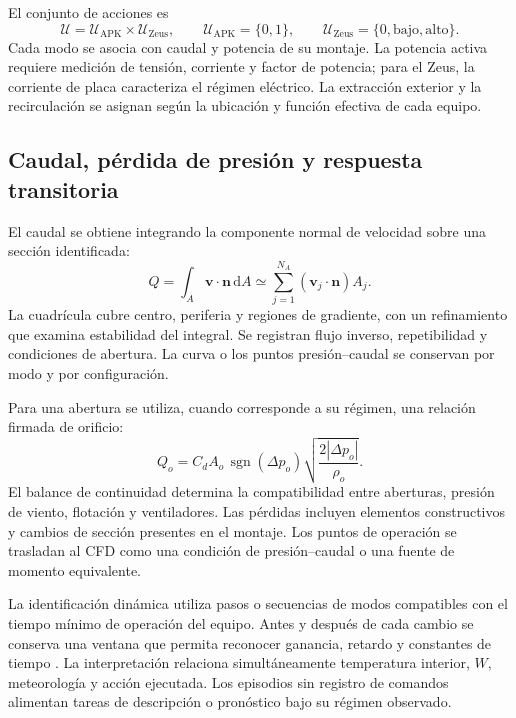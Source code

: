 El conjunto de acciones es
\begin{equation}
\mathcal U=\mathcal U_{\mathrm{APK}}\times\mathcal U_{\mathrm{Zeus}},\qquad
\mathcal U_{\mathrm{APK}}=\{0,1\},\qquad
\mathcal U_{\mathrm{Zeus}}=\{0,\mathrm{bajo},\mathrm{alto}\}.
\label{met:acciones}
\end{equation}
Cada modo se asocia con caudal y potencia de su montaje. La potencia activa requiere medición de tensión, corriente y factor de potencia; para el Zeus, la corriente de placa caracteriza el régimen eléctrico. La extracción exterior y la recirculación se asignan según la ubicación y función efectiva de cada equipo.

\subsection{Caudal, pérdida de presión y respuesta transitoria}
\label{met:caudal}

El caudal se obtiene integrando la componente normal de velocidad sobre una sección identificada:
\begin{equation}
Q=\int_A\mathbf v\cdot\mathbf n\,\mathrm dA
\simeq\sum_{j=1}^{N_A}(\mathbf v_j\cdot\mathbf n)A_j.
\label{met:caudal_integrado}
\end{equation}
La cuadrícula cubre centro, periferia y regiones de gradiente, con un refinamiento que examina estabilidad del integral. Se registran flujo inverso, repetibilidad y condiciones de abertura. La curva o los puntos presión--caudal se conservan por modo y por configuración.

Para una abertura se utiliza, cuando corresponde a su régimen, una relación firmada de orificio:
\begin{equation}
Q_o=C_dA_o\,\operatorname{sgn}(\Delta p_o)
\sqrt{\frac{2|\Delta p_o|}{\rho_o}}.
\label{met:abertura_presion}
\end{equation}
El balance de continuidad determina la compatibilidad entre aberturas, presión de viento, flotación y ventiladores. Las pérdidas incluyen elementos constructivos y cambios de sección presentes en el montaje. Los puntos de operación se trasladan al CFD como una condición de presión--caudal o una fuente de momento equivalente.

La identificación dinámica utiliza pasos o secuencias de modos compatibles con el tiempo mínimo de operación del equipo. Antes y después de cada cambio se conserva una ventana que permita reconocer ganancia, retardo y constantes de tiempo \cite{ljung1999}. La interpretación relaciona simultáneamente temperatura interior, $W$, meteorología y acción ejecutada. Los episodios sin registro de comandos alimentan tareas de descripción o pronóstico bajo su régimen observado.

